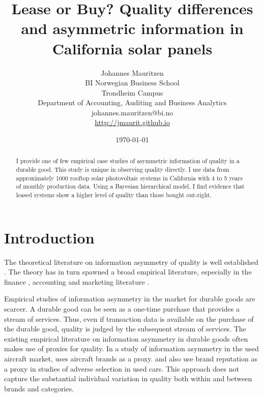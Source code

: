\documentclass[12pt]{article}
\title{Lease or Buy? Quality differences and asymmetric information in California solar panels}
\date{\today}
\author{Johannes Mauritzen\\ BI Norwegian Business School\\ Trondheim Campus \\Department of Accounting, Auditing and Business Analytics \\johannes.mauritzen@bi.no\\\url{http://jmaurit.github.io}}
\begin{document}
  \begin{spacing}{1} %
 	\maketitle

 \begin{abstract}
  I provide one of few empirical case studies of asymmetric information of quality in a durable good. This study is unique in observing quality directly. I use data from approximately 1000 rooftop solar photovoltaic systems in California with 4 to 5 years of monthly production data. Using a Bayesian hierarchical model, I find evidence that leased systems show a higher level of quality than those bought out-right. 

 \end{abstract}

  \end{spacing}

\section{Introduction}

The theoretical literature on information asymmetry of quality is well established \citep{akerlof_market_1970, chan_prices_1982,tirole_theory_1988}. The theory has in turn spawned a broad empirical literature, especially in the finance \citep{michaely_pricing_1994, petersen_benefits_1994,adams_liquidity_2009,dobbie_information_2013}, accounting \citep{healy_information_2001} and marketing literature \citep{kirmani_no_2000}. 

Empirical studies of information asymmetry in the market for durable goods are scarcer. A durable good can be seen as a one-time purchase that provides a stream of services. Thus, even if transaction data is available on the purchase of the durable good, quality is judged by the subsequent stream of services. The existing empirical literature on information asymmetry in durable goods often makes use of proxies for quality. In a study of information asymmetry in the used aircraft market, \citet{gilligan_lemons_2004} uses aircraft brands as a proxy. \citet{peterson_adverse_2014} and \citet{emons_market_2009} also use brand reputation as a proxy in studies of adverse selection in used cars. This approach does not capture the substantial individual variation in quality both within and between brands and categories. 
\end{document}
